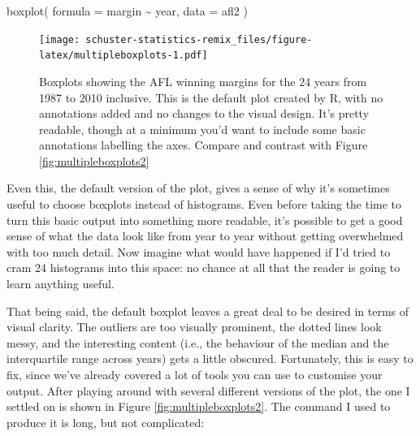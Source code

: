 \documentclass[
]{book}
\newenvironment{Shaded}{\begin{snugshade}}{\end{snugshade}}
\newcommand{\AttributeTok}[1]{\textcolor[rgb]{0.77,0.63,0.00}{#1}}
\newcommand{\FunctionTok}[1]{\textcolor[rgb]{0.00,0.00,0.00}{#1}}
\newcommand{\NormalTok}[1]{#1}
\newcommand{\SpecialCharTok}[1]{\textcolor[rgb]{0.00,0.00,0.00}{#1}}
\begin{document}
\begin{Shaded}
\begin{Highlighting}[]
\FunctionTok{boxplot}\NormalTok{( }\AttributeTok{formula =}\NormalTok{ margin }\SpecialCharTok{\textasciitilde{}}\NormalTok{ year,}
         \AttributeTok{data =}\NormalTok{ afl2}
\NormalTok{)}
\end{Highlighting}
\end{Shaded}

\begin{figure}
\centering
\texttt{[image: schuster-statistics-remix\_files/figure-latex/multipleboxplots-1.pdf]}
\caption{\label{fig:multipleboxplots}Boxplots showing the AFL winning margins for the 24 years from 1987 to 2010 inclusive. This is the default plot created by R, with no annotations added and no changes to the visual design. It's pretty readable, though at a minimum you'd want to include some basic annotations labelling the axes. Compare and contrast with Figure \ref{fig:multipleboxplots2}}
\end{figure}

Even this, the default version of the plot, gives a sense of why it's sometimes useful to choose boxplots instead of histograms. Even before taking the time to turn this basic output into something more readable, it's possible to get a good sense of what the data look like from year to year without getting overwhelmed with too much detail. Now imagine what would have happened if I'd tried to cram 24 histograms into this space: no chance at all that the reader is going to learn anything useful.

That being said, the default boxplot leaves a great deal to be desired in terms of visual clarity. The outliers are too visually prominent, the dotted lines look messy, and the interesting content (i.e., the behaviour of the median and the interquartile range across years) gets a little obscured. Fortunately, this is easy to fix, since we've already covered a lot of tools you can use to customise your output. After playing around with several different versions of the plot, the one I settled on is shown in Figure \ref{fig:multipleboxplots2}. The command I used to produce it is long, but not complicated:
\end{document}
